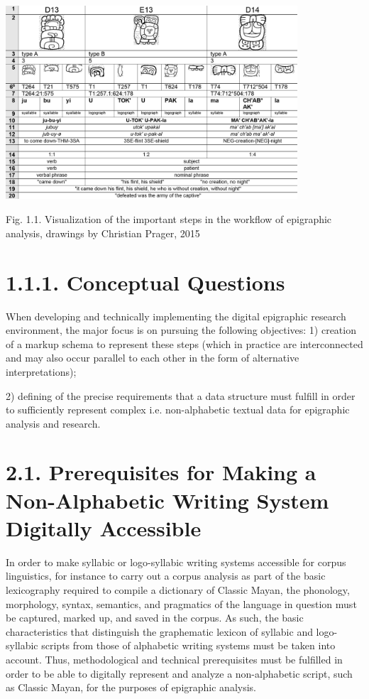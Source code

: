 \documentclass[amsthm,ebook]{saparticle}
\begin{document}
\bigskip

 \includegraphics[width=10.881cm,height=7.214cm]{EAGLE2016submission8revisedx-img001.png} 


\bigskip

Fig. 1.1. Visualization of the important steps in the workflow of epigraphic analysis, drawings by Christian Prager,
2015


\bigskip

\section[1.1.1. Conceptual Questions]{1.1.1. Conceptual Questions}
When developing and technically implementing the digital epigraphic research environment, the major focus is on pursuing
the following objectives: 1) creation of a markup schema to represent these steps (which in practice are interconnected
and may also occur parallel to each other in the form of alternative interpretations); 

2) defining of the precise requirements that a data structure must fulfill in order to sufficiently represent complex
i.e. non-alphabetic textual data for epigraphic analysis and research. 

\section[2.1. Prerequisites for Making a Non{}-Alphabetic Writing System Digitally Accessible]{2.1. Prerequisites for
Making a Non-Alphabetic Writing System Digitally Accessible}
In order to make syllabic or logo-syllabic writing systems accessible for corpus linguistics, for instance to carry out
a corpus analysis as part of the basic lexicography required to compile a dictionary of Classic Mayan, the phonology,
morphology, syntax, semantics, and pragmatics of the language in question must be captured, marked up, and saved in the
corpus. As such, the basic characteristics that distinguish the graphematic lexicon of syllabic and logo-syllabic
scripts from those of alphabetic writing systems must be taken into account. Thus, methodological and technical
prerequisites must be fulfilled in order to be able to digitally represent and analyze a non-alphabetic script, such as
Classic Mayan, for the purposes of epigraphic analysis.
\end{document}
